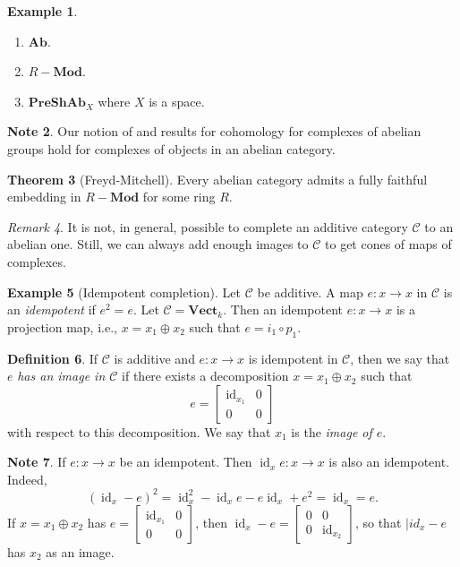 \documentclass[10pt,letterpaper,cm]{nupset}
\theoremstyle{definition}
\newtheorem{definition}{Definition}[subsection]
\newtheorem{exmp}[definition]{Example}
\newtheorem{note}[definition]{Note}
\theoremstyle{theorem}
\newtheorem{theorem}[definition]{Theorem}
\theoremstyle{remark}
\newtheorem{remark}[definition]{Remark}
\newcommand{\1}{\mathbf{1}}
\renewcommand{\c}{\mathscr{C}}
\newcommand{\0}{\vec 0}
\DeclareMathOperator{\id}{id}
\begin{document}
\begin{exmp} $ $
\begin{enumerate}
\item $\mathbf{Ab}$.
\item $R{-}\mathbf{Mod}$.
\item $\mathbf{PreShAb}_X$ where $X$ is a space.
\end{enumerate}
\end{exmp}

\begin{note}
Our notion of and results for cohomology for complexes of abelian groups hold for complexes of objects in an abelian category.
\end{note}

\begin{theorem}[Freyd-Mitchell]
Every abelian  category admits a fully faithful embedding in $R{-}\mathbf{Mod}$ for some ring $R$.
\end{theorem}

\begin{remark}
It is not, in general, possible to complete an additive category $\c$ to an abelian one. Still, we can always add enough images to $\c$ to get cones of maps of complexes.
\end{remark}

\begin{exmp}[Idempotent completion]
Let $\c$ be additive. A map $e: x\to x$ in $\c$ is an \textit{idempotent} if $e^2=e$. Let $\c= \mathbf{Vect}_k$. Then an idempotent $e : x \to x$ is a projection map, i.e., $x = x_1 \oplus x_2$ such that $e = i_1 \circ p_1$.
\end{exmp}

\begin{definition}
If $\c$ is additive and $e: x \to x$ is idempotent in $\c$, then we say that $e$ \textit{has an image in $\c$} if there exists a decomposition $x = x_1 \oplus x_2$ such that $$e = \begin{bmatrix} \id_{x_1} & 0 \\ 0 & 0   \end{bmatrix}    $$ with respect to this decomposition. We say that $x_1$ is the \textit{image of $e$}.
\end{definition}

\begin{note}
If $e : x \to x$ be an idempotent. Then $\id_{x}{e} : x \to x$ is also an idempotent. Indeed, $$ (\id_x - e)^2 = \id_x^2 - \id_x{e} - e {\id_x} + e^2 = \id_x = e   .$$ If $x = x_1 \oplus x_2$ has $e = \begin{bmatrix}  \id_{x_1} & 0 \\ 0 & 0 \end{bmatrix}$, then $\id_x - e = \begin{bmatrix}  0 & 0 \\ 0 & \id_{x_2} \end{bmatrix}$, so that $|id_x - e$ has $x_2$ as an image.
\end{note}
\end{document}
